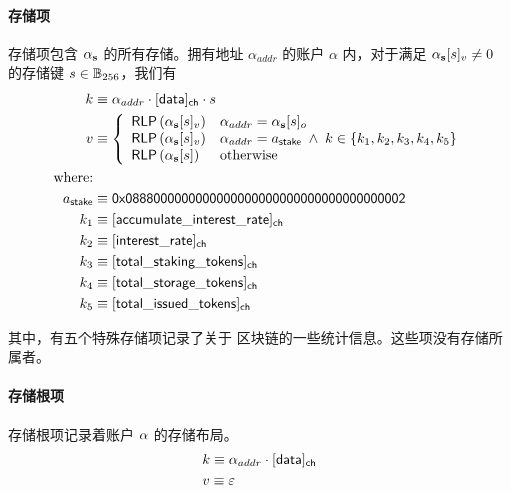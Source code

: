 	

\paragraph{存储项} 存储项包含 $\mathbf{\alpha}_{\bf s}$ 的所有存储。拥有地址 $\alpha_{addr}$ 的账户 $\alpha$ 内，对于满足 $\mathbf{\alpha}_{\bf s}[s]_v\neq 0$ 的存储键 $s\in \mathbb{B}_{256}$，我们有
\begin{align}
	k&\eqdef \alpha_{addr}\cdot [{\sf data}]_{\sf ch}\cdot s \\
	v&\eqdef \left\{ \begin{array}{ll}
		\rlp\left(\account_{\bf s}[s]_v\right) & \alpha_{addr} = \account_{\bf s}[s]_o \\ 
		\rlp\left(\account_{\bf s}[s]_v\right) & \alpha_{addr} = a_{\sf stake} \;\wedge\; k \in \{k_1,k_2,k_3,k_4,k_5\} \\ 
		\rlp\left(\account_{\bf s}[s]\right) & \mbox{otherwise}
	\end{array}\right.\\
	\mbox{where:} &\\
	a_{\sf stake} &\eqdef \stakingcontract \\
	k_1 &\eqdef \sf [accumulate\char`_interest\char`_rate]_{\sf ch} \\ 
	k_2 &\eqdef \sf [interest\char`_rate]_{\sf ch} \\
    k_3 &\eqdef \sf [total\char`_staking\char`_tokens]_{\sf ch} \\
    k_4 &\eqdef \sf [total\char`_storage\char`_tokens]_{\sf ch} \\
    k_5 &\eqdef \sf [total\char`_issued\char`_tokens]_{\sf ch} 
\end{align}

其中，有五个特殊存储项记录了关于 \name 区块链的一些统计信息。这些项没有存储所属者。

\paragraph{存储根项} 存储根项记录着账户 $\mathbf{\alpha}$ 的存储布局。
\begin{align}
	&k\equiv \alpha_{addr}\cdot [{\sf data}]_{\sf ch}\\
	&v\equiv \mathbb{\varepsilon}
\end{align}

